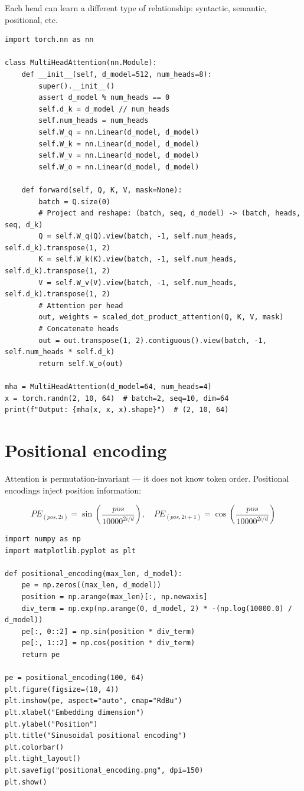 Each head can learn a different type of relationship: syntactic, semantic, positional, etc.

\begin{verbatim}
import torch.nn as nn

class MultiHeadAttention(nn.Module):
    def __init__(self, d_model=512, num_heads=8):
        super().__init__()
        assert d_model % num_heads == 0
        self.d_k = d_model // num_heads
        self.num_heads = num_heads
        self.W_q = nn.Linear(d_model, d_model)
        self.W_k = nn.Linear(d_model, d_model)
        self.W_v = nn.Linear(d_model, d_model)
        self.W_o = nn.Linear(d_model, d_model)

    def forward(self, Q, K, V, mask=None):
        batch = Q.size(0)
        # Project and reshape: (batch, seq, d_model) -> (batch, heads, seq, d_k)
        Q = self.W_q(Q).view(batch, -1, self.num_heads, self.d_k).transpose(1, 2)
        K = self.W_k(K).view(batch, -1, self.num_heads, self.d_k).transpose(1, 2)
        V = self.W_v(V).view(batch, -1, self.num_heads, self.d_k).transpose(1, 2)
        # Attention per head
        out, weights = scaled_dot_product_attention(Q, K, V, mask)
        # Concatenate heads
        out = out.transpose(1, 2).contiguous().view(batch, -1, self.num_heads * self.d_k)
        return self.W_o(out)

mha = MultiHeadAttention(d_model=64, num_heads=4)
x = torch.randn(2, 10, 64)  # batch=2, seq=10, dim=64
print(f"Output: {mha(x, x, x).shape}")  # (2, 10, 64)
\end{verbatim}

\section{Positional encoding}

Attention is permutation-invariant --- it does not know token order. Positional encodings inject position information:

\[
PE_{(pos, 2i)} = \sin\!\left(\frac{pos}{10000^{2i/d}}\right), \quad
PE_{(pos, 2i+1)} = \cos\!\left(\frac{pos}{10000^{2i/d}}\right)
\]

\begin{verbatim}
import numpy as np
import matplotlib.pyplot as plt

def positional_encoding(max_len, d_model):
    pe = np.zeros((max_len, d_model))
    position = np.arange(max_len)[:, np.newaxis]
    div_term = np.exp(np.arange(0, d_model, 2) * -(np.log(10000.0) / d_model))
    pe[:, 0::2] = np.sin(position * div_term)
    pe[:, 1::2] = np.cos(position * div_term)
    return pe

pe = positional_encoding(100, 64)
plt.figure(figsize=(10, 4))
plt.imshow(pe, aspect="auto", cmap="RdBu")
plt.xlabel("Embedding dimension")
plt.ylabel("Position")
plt.title("Sinusoidal positional encoding")
plt.colorbar()
plt.tight_layout()
plt.savefig("positional_encoding.png", dpi=150)
plt.show()
\end{verbatim}

